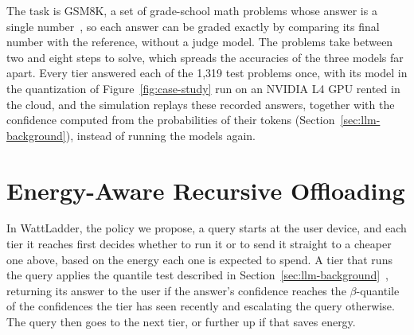 \documentclass[cic,dipl,english]{infufrgs}
\begin{document}
The task is GSM8K, a set of grade-school math problems whose answer is a single
number~\cite{cobbe2021training}, so each answer can be graded exactly by comparing its
final number with the reference, without a judge model. The problems take between two
and eight steps to solve, which spreads the accuracies of the three models far apart.
Every tier answered each of the 1,319 test problems once, with its model in the quantization
of Figure~\ref{fig:case-study} run on an NVIDIA L4 GPU rented in the cloud, and the simulation
replays these recorded answers, together with the confidence computed from the probabilities of
their tokens (Section~\ref{sec:llm-background}), instead of running the models again.

\section{Energy-Aware Recursive Offloading}
\label{sec:policy}

In WattLadder, the policy we propose, a query starts at the user device, and each tier it reaches
first decides whether to run it or to send it straight to a cheaper one above, based on
the energy each one is expected to spend. A tier that runs the query applies the quantile
test described in Section~\ref{sec:llm-background}~\cite{wu2025recserve}, returning its
answer to the user if the answer's confidence reaches the $\beta$-quantile of the
confidences the tier has seen recently and escalating the query otherwise. The query then
goes to the next tier, or further up if that saves energy.
\end{document}
